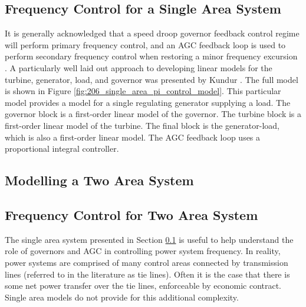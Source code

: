 
\subsection{Frequency Control for a Single Area System}\label{oneareapowersystem}
It is generally acknowledged that a speed droop governor feedback control regime will perform primary frequency control, and an AGC feedback loop is used to perform secondary frequency control when restoring a minor frequency excursion \cite{Wood2013, Grainger1994, Kothari2011, Kundur1994}. A particularly well laid out approach to developing linear models for the turbine, generator, load, and governor was presented by Kundur \cite{Kundur1994}. The full model is shown in Figure \ref{fig:206_single_area_pi_control_model}. This particular model provides a model for a single regulating generator supplying a load. The governor block is a first-order linear model of the governor. The turbine block is a first-order linear model of the turbine. The final block is the generator-load, which is also a first-order linear model. The AGC feedback loop uses a proportional integral controller.

\clearpage

\begin{sidewaysfigure}[ht]
\centering

\caption[Single power area with PI feedback control]{A classical feedback control approach for a single control area power system. The system is comprised of a first order models for both turbines, and generators. The governor controllers are also first order models. AGC is implemented using an integral control block in a feedback loop \cite{Kundur1994}.}
\label{fig:206_single_area_pi_control_model}
\end{sidewaysfigure}

\clearpage


\subsection{Modelling a Two Area System} \label{ssec:modelling_two_area_system}


\subsection{Frequency Control for Two Area System} \label{ssec:control_two_area_system}
The single area system presented in Section \ref{oneareapowersystem} is useful to help understand the role of governors and AGC in controlling power system frequency. In reality, power systems are comprised of many control areas connected by transmission lines (referred to in the literature as tie lines). Often it is the case that there is some net power transfer over the tie lines, enforceable by economic contract. Single area models do not provide for this additional complexity.

